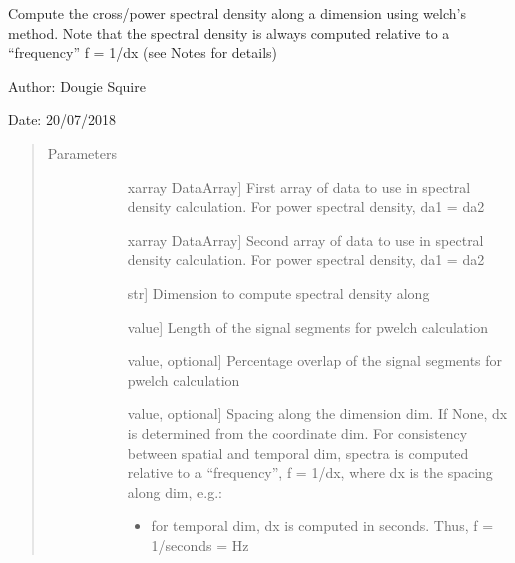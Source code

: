 \documentclass[letterpaper,10pt,english]{sphinxmanual}
\begin{document}
\begin{fulllineitems}
\label{\detokenize{diagnostic_doc:diagnostic.pwelch}}
Compute the cross/power spectral density along a dimension using welch’s method. Note that                 the spectral density is always computed relative to a “frequency” f = 1/dx (see Notes for                 details)

\begin{DUlineblock}{0em}
\item[] Author: Dougie Squire
\item[] Date: 20/07/2018
\end{DUlineblock}
\begin{quote}\begin{description}
\item[{Parameters}] \leavevmode\begin{description}
\item[{}] \leavevmode{[}xarray DataArray{]}
First array of data to use in spectral density calculation. For power spectral density,                     da1 = da2

\item[{}] \leavevmode{[}xarray DataArray{]}
Second array of data to use in spectral density calculation. For power spectral density,                     da1 = da2

\item[{}] \leavevmode{[}str{]}
Dimension to compute spectral density along

\item[{}] \leavevmode{[}value{]}
Length of the signal segments for pwelch calculation

\item[{}] \leavevmode{[}value, optional{]}
Percentage overlap of the signal segments for pwelch calculation

\item[{}] \leavevmode{[}value, optional{]}
Spacing along the dimension dim. If None, dx is determined from the coordinate dim. For                     consistency between spatial and temporal dim, spectra is computed relative to a “frequency”,                     f = 1/dx, where dx is the spacing along dim, e.g.:
\begin{itemize}
\item {} 
for temporal dim, dx is computed in seconds. Thus, f = 1/seconds = Hz


\end{itemize}
\end{description}
\end{description}
\end{quote}
\end{fulllineitems}
\end{document}
